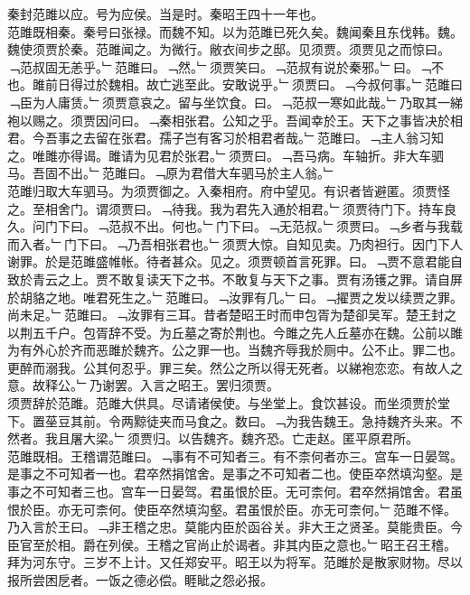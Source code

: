 \documentclass{zhvt-classic}
\begin{document}
\hspace*{2em}秦封范雎以应。号为应侯。当是时。秦昭王四十一年也。\\
\hspace*{2em}范雎既相秦。秦号曰张禄。而魏不知。以为范雎已死久矣。魏闻秦且东伐韩。魏。魏使须贾於秦。范雎闻之。为微行。敝衣间步之邸。见须贾。须贾见之而惊曰。﹁范叔固无恙乎。﹂范雎曰。﹁然。﹂须贾笑曰。﹁范叔有说於秦邪。﹂曰。﹁不也。雎前日得过於魏相。故亡逃至此。安敢说乎。﹂须贾曰。﹁今叔何事。﹂范雎曰﹁臣为人庸赁。﹂须贾意哀之。留与坐饮食。曰。﹁范叔一寒如此哉。﹂乃取其一綈袍以赐之。须贾因问曰。﹁秦相张君。公知之乎。吾闻幸於王。天下之事皆决於相君。今吾事之去留在张君。孺子岂有客习於相君者哉。﹂范雎曰。﹁主人翁习知之。唯雎亦得谒。雎请为见君於张君。﹂须贾曰。﹁吾马病。车轴折。非大车驷马。吾固不出。﹂范雎曰。﹁原为君借大车驷马於主人翁。﹂\\
\hspace*{2em}范雎归取大车驷马。为须贾御之。入秦相府。府中望见。有识者皆避匿。须贾怪之。至相舍门。谓须贾曰。﹁待我。我为君先入通於相君。﹂须贾待门下。持车良久。问门下曰。﹁范叔不出。何也。﹂门下曰。﹁无范叔。﹂须贾曰。﹁乡者与我载而入者。﹂门下曰。﹁乃吾相张君也。﹂须贾大惊。自知见卖。乃肉袒行。因门下人谢罪。於是范雎盛帷帐。待者甚众。见之。须贾顿首言死罪。曰。﹁贾不意君能自致於青云之上。贾不敢复读天下之书。不敢复与天下之事。贾有汤镬之罪。请自屏於胡貉之地。唯君死生之。﹂范雎曰。﹁汝罪有几。﹂曰。﹁擢贾之发以续贾之罪。尚未足。﹂范雎曰。﹁汝罪有三耳。昔者楚昭王时而申包胥为楚卻吴军。楚王封之以荆五千户。包胥辞不受。为丘墓之寄於荆也。今雎之先人丘墓亦在魏。公前以雎为有外心於齐而恶雎於魏齐。公之罪一也。当魏齐辱我於厕中。公不止。罪二也。更醉而溺我。公其何忍乎。罪三矣。然公之所以得无死者。以綈袍恋恋。有故人之意。故释公。﹂乃谢罢。入言之昭王。罢归须贾。\\
\hspace*{2em}须贾辞於范雎。范雎大供具。尽请诸侯使。与坐堂上。食饮甚设。而坐须贾於堂下。置莝豆其前。令两黥徒夹而马食之。数曰。﹁为我告魏王。急持魏齐头来。不然者。我且屠大梁。﹂须贾归。以告魏齐。魏齐恐。亡走赵。匿平原君所。\\
\hspace*{2em}范雎既相。王稽谓范雎曰。﹁事有不可知者三。有不柰何者亦三。宫车一日晏驾。是事之不可知者一也。君卒然捐馆舍。是事之不可知者二也。使臣卒然填沟壑。是事之不可知者三也。宫车一日晏驾。君虽恨於臣。无可柰何。君卒然捐馆舍。君虽恨於臣。亦无可柰何。使臣卒然填沟壑。君虽恨於臣。亦无可柰何。﹂范雎不怿。乃入言於王曰。﹁非王稽之忠。莫能内臣於函谷关。非大王之贤圣。莫能贵臣。今臣官至於相。爵在列侯。王稽之官尚止於谒者。非其内臣之意也。﹂昭王召王稽。拜为河东守。三岁不上计。又任郑安平。昭王以为将军。范雎於是散家财物。尽以报所尝困戹者。一饭之德必偿。睚眦之怨必报。\\
\end{document}
